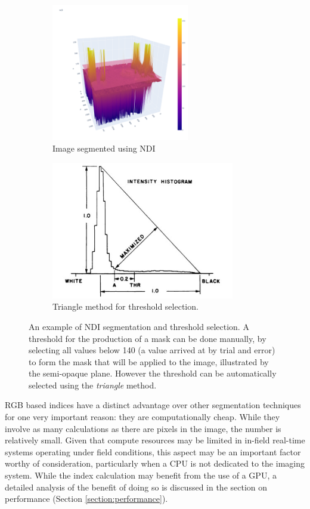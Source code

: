\documentclass[letterpaper, notitlepage]{report}
\begin{document}
{\begin{figure}[h!]
	\centering
	\begin{subfigure}[h]{.49\textwidth}
	  \centering
	  \includegraphics[height=6cm]{./figures/ndi-1-of-2.png}
	  \caption{Image segmented using NDI}
	  \label{fig:ndi-1}
	\end{subfigure}
	\begin{subfigure}[h]{.49\textwidth}
	  \centering
	  \includegraphics[height=6cm]{./figures/triangle-algorithm}
	  \caption{Triangle method for threshold selection.}
	  \label{fig:ndi-2}
	\end{subfigure}
	\hfil
	\caption[NDI segmentation and threshold selection]{An example of NDI segmentation and threshold selection. A threshold for the production of a mask can be done manually,  by selecting all values below 140 (a value arrived at by trial and error) to form the mask that will be applied to the image, illustrated by the semi-opaque plane. However the threshold can be automatically selected using the \textit{triangle} method.}
	\label{fig:ndi-segmentation}
\end{figure}

RGB based indices have a distinct advantage over other segmentation techniques for one very important reason: they are computationally cheap. While they involve as many calculations as there are pixels in the image, the number is relatively small. Given that compute resources may be limited in in-field real-time systems operating under field conditions, this aspect may be an important factor worthy of consideration, particularly when a CPU is not dedicated to the imaging system. While the index calculation may benefit from the use of  a GPU, a detailed analysis of the benefit of doing so is discussed in the section on performance (Section \ref{section:performance}).

}
\end{document}
